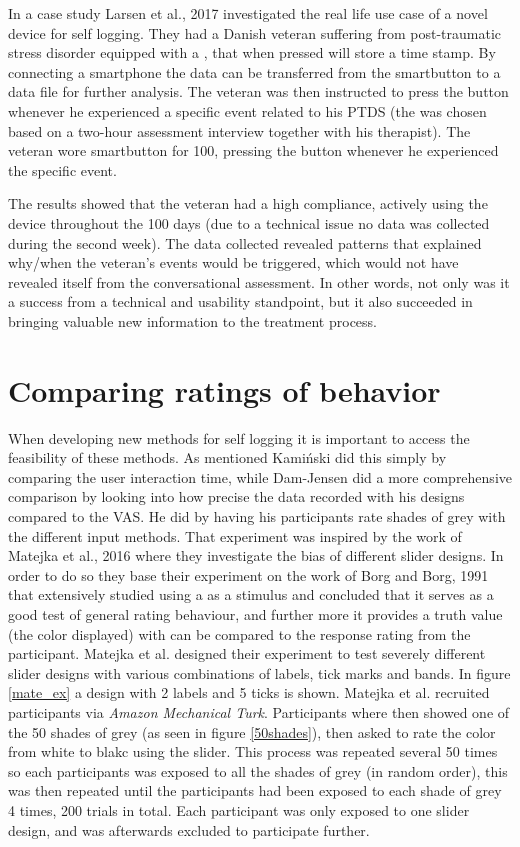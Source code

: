 In a case study Larsen et al., 2017\cite{eg} investigated the real life use case of a novel device for self logging. They had a Danish veteran suffering from post-traumatic stress disorder equipped with a , that when pressed will store a time stamp. By connecting a smartphone the data can be transferred from the smartbutton to a data file for further analysis. The veteran was then instructed to press the button whenever he experienced a specific event related to his PTDS (the  was chosen based on a two-hour assessment interview together with his therapist). The veteran wore smartbutton for 100, pressing the button whenever he experienced the specific event.

The results showed that the veteran had a high compliance, actively using the device throughout the 100 days (due to a technical issue no data was collected during the second week). The data collected revealed patterns that explained why/when the veteran's events would be triggered, which would not have revealed itself from the conversational assessment. In other words, not only was it a success from a technical and usability standpoint, but it also succeeded in bringing valuable new information to the treatment process. 

\section{Comparing ratings of behavior}
When developing new methods for self logging it is important to access the feasibility of these methods. As mentioned Kami\'nski did this simply by comparing the user interaction time, while Dam-Jensen did a more comprehensive comparison by looking into how precise the data recorded with his designs compared to the VAS. He did by having his participants rate shades of grey with the different input methods. That experiment was inspired by the work of Matejka et al., 2016 \cite{grey} where they investigate the bias of different slider designs. In order to do so they base their experiment on the work of Borg and Borg, 1991\cite{borg} that extensively studied using a  as a stimulus and concluded that it serves as a good test of general rating behaviour, and further more it provides a truth value (the color displayed) with can be compared to the response rating from the participant. Matejka et al. designed their experiment to test severely different slider designs with various combinations of labels, tick marks and bands. In figure \ref{mate_ex} a design with 2 labels and 5 ticks is shown. Matejka et al. recruited participants via \emph{Amazon Mechanical Turk}\cite{turk}. Participants where then showed one of the 50 shades of grey (as seen in figure \ref{50shades}), then asked to rate the color from white to blakc using the slider. This process was repeated several 50 times so each participants was exposed to all the shades of grey (in random order), this was then repeated until the participants had been exposed to each shade of grey 4 times, 200 trials in total. Each participant was only exposed to one slider design, and was afterwards excluded to participate further. 

